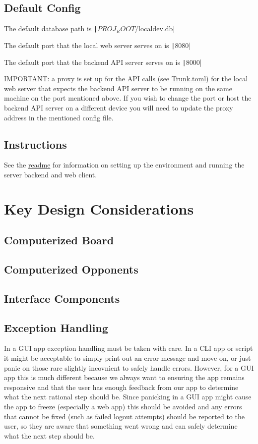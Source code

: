 \documentclass{article}
\begin{document}
\subsection{Default Config}

The default database path is \texttt|$PROJ_ROOT$/localdev.db|

The default port that the local web server serves on is \texttt|8080|

The default port that the backend API server serves on is \texttt|8000|

IMPORTANT: a proxy is set up for the API calls (see \href{run: ../Trunk.toml}{Trunk.toml}) for the local web server that expects the backend API server to be running on the same machine on the port mentioned above.
If you wish to change the port or host the backend API server on a different device you will need to update the proxy address in the mentioned config file.

\subsection{Instructions}

See the \href{run:../README.md}{readme} for information on setting up the environment and running the server backend and web client.

\section{Key Design Considerations}

\subsection{Computerized Board}

\subsection{Computerized Opponents}

\subsection{Interface Components}

\subsection{Exception Handling}

In a GUI app exception handling must be taken with care.
In a CLI app or script it might be acceptable to simply print out an error message and move on, or just panic on those rare slightly incovnient to safely handle errors.
However, for a GUI app this is much different because we always want to ensuring the app remains responsive and that the user has enough feedback from our app to determine what the next rational step should be.
Since panicking in a GUI app might cause the app to freeze (especially a web app) this should be avoided and any errors that cannot be fixed (such as failed logout attempts) should be reported to the user, so they are aware that something went wrong and can safely determine what the next step should be. 
\end{document}
